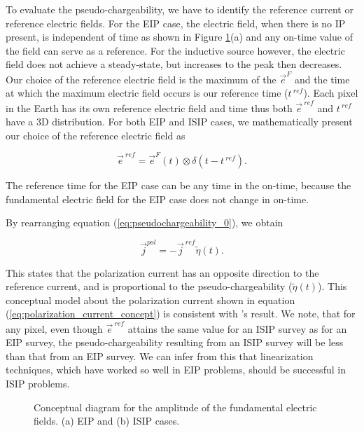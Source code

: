 \documentclass[extra,mreferee]{gji}
\renewcommand {\j}  { {\vec j} }
\newcommand {\e}  { {\vec e} }
\newcommand{\peta}{\tilde{\eta}}
\newcommand{\eref}{\e^{\ ref}}
\newcommand{\jref}{\j^{\ ref}}
\begin{document}
To evaluate the pseudo-chargeability, we have to identify the reference current or reference electric fields. For the EIP case, the electric field, when there is no IP present, is independent of time as shown in Figure \ref{F:DCEM_F_current}(a) and any on-time value of the field can serve as a reference. For the inductive source however, the electric field does not achieve a steady-state, but increases to the peak then decreases. Our choice of the reference electric field is the maximum of the $\e^{F}$ and the  time at which the  maximum electric field occurs is our reference time ($t^{\ ref}$).
Each pixel in the Earth has its own reference electric field and time thus  both $\eref$ and $t^{\ ref}$ have a 3D distribution. 
For both EIP and ISIP cases, we mathematically present our choice of the reference electric field as
\begin{linenomath*}
\begin{equation}
  \eref = \e^{F}(t) \otimes \delta(t-t^{\ ref}). 
  \label{eq:reference_electricfield}
\end{equation}
\end{linenomath*}
The reference time for the EIP case can be any time in the on-time, because the fundamental electric field for the EIP case does not change in on-time. 

By rearranging equation (\ref{eq:pseudochargeability_0}), we obtain 
\begin{linenomath*}
\begin{equation}
  \j^{pol} = -\jref\peta(t). 
  \label{eq:polarization_current_concept}
\end{equation}
\end{linenomath*}
This states that the polarization current has an opposite direction to the reference current, and is proportional to the pseudo-chargeability ($\peta(t)$). 
This conceptual model about the polarization current shown in equation (\ref{eq:polarization_current_concept}) is consistent with \cite{seigel1959}'s result. We note, that for any pixel, even though  $\eref$  attains the same value for an ISIP survey as for an EIP survey, the pseudo-chargeability resulting from  an ISIP survey  will be less than that from an EIP survey. We can infer from this that  linearization techniques, which  have worked so well in EIP problems, should be successful in ISIP problems. 

\begin{figure}  
  \caption{Conceptual diagram for the amplitude of the fundamental electric fields. (a) EIP and (b) ISIP cases.}
  \label{F:DCEM_F_current}
\end{figure}   
\end{document}
